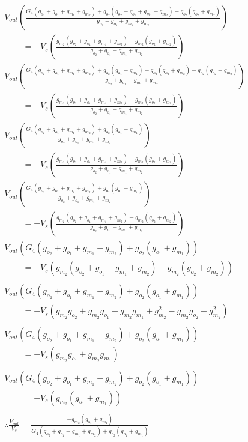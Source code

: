 \begin{enumerate}
\begin{align*}
      V_{out}\left(\frac{G_4(g_{o_2} + g_{o_1} + g_{m_1} + g_{m_2}) + g_{o_2}(g_{o_2} + g_{o_1} + g_{m_1} + g_{m_2}) - g_{o_2}(g_{o_2} + g_{m_2})}{g_{o_2} + g_{o_1} + g_{m_1} + g_{m_2}}\right) \\ \qquad \, = -V_{s}\left(\frac{g_{m_2}(g_{o_2} + g_{o_1} + g_{m_1} + g_{m_2}) - g_{m_2}(g_{o_2} + g_{m_2})}{g_{o_2} + g_{o_1} + g_{m_1} + g_{m_2}}\right) \\
      V_{out}\left(\frac{G_4(g_{o_2} + g_{o_1} + g_{m_1} + g_{m_2}) + g_{o_2}(g_{o_1} + g_{m_1}) + g_{o_2}(g_{o_2} + g_{m_2}) - g_{o_2}(g_{o_2} + g_{m_2})}{g_{o_2} + g_{o_1} + g_{m_1} + g_{m_2}}\right) \\ \qquad \, = -V_{s}\left(\frac{g_{m_2}(g_{o_2} + g_{o_1} + g_{m_1} + g_{m_2}) - g_{m_2}(g_{o_2} + g_{m_2})}{g_{o_2} + g_{o_1} + g_{m_1} + g_{m_2}}\right) \\
      V_{out}\left(\frac{G_4(g_{o_2} + g_{o_1} + g_{m_1} + g_{m_2}) + g_{o_2}(g_{o_1} + g_{m_1})}{g_{o_2} + g_{o_1} + g_{m_1} + g_{m_2}}\right) \\ \qquad \, = -V_{s}\left(\frac{g_{m_2}(g_{o_2} + g_{o_1} + g_{m_1} + g_{m_2}) - g_{m_2}(g_{o_2} + g_{m_2})}{g_{o_2} + g_{o_1} + g_{m_1} + g_{m_2}}\right) \\
      V_{out}\left(\frac{G_4(g_{o_2} + g_{o_1} + g_{m_1} + g_{m_2}) + g_{o_2}(g_{o_1} + g_{m_1})}{g_{o_2} + g_{o_1} + g_{m_1} + g_{m_2}}\right) \\ \qquad \, = -V_{s}\left(\frac{g_{m_2}(g_{o_2} + g_{o_1} + g_{m_1} + g_{m_2}) - g_{m_2}(g_{o_2} + g_{m_2})}{g_{o_2} + g_{o_1} + g_{m_1} + g_{m_2}}\right) \\
      V_{out}(G_4(g_{o_2} + g_{o_1} + g_{m_1} + g_{m_2}) + g_{o_2}(g_{o_1} + g_{m_1})) \\ \qquad \, = -V_{s}(g_{m_2}(g_{o_2} + g_{o_1} + g_{m_1} + g_{m_2}) - g_{m_2}(g_{o_2} + g_{m_2})) \\\\
      V_{out}(G_4(g_{o_2} + g_{o_1} + g_{m_1} + g_{m_2}) + g_{o_2}(g_{o_1} + g_{m_1})) \\ \qquad \, = -V_{s}(g_{m_2}g_{o_2} + g_{m_2}g_{o_1} + g_{m_2}g_{m_1} + g_{m_2}^2 - g_{m_2}g_{o_2} - g_{m_2}^2) \\\\
      V_{out}(G_4(g_{o_2} + g_{o_1} + g_{m_1} + g_{m_2}) + g_{o_2}(g_{o_1} + g_{m_1})) \\ \qquad \, = -V_{s}(g_{m_2}g_{o_1} + g_{m_2}g_{m_1}) \\\\
      V_{out}(G_4(g_{o_2} + g_{o_1} + g_{m_1} + g_{m_2}) + g_{o_2}(g_{o_1} + g_{m_1})) \\ \qquad \, = -V_{s}(g_{m_2}(g_{o_1} + g_{m_1})) \\\\
      \therefore \frac{V_{out}}{V_s} = \frac{-g_{m_2}(g_{o_1} + g_{m_1})}{G_4(g_{o_2} + g_{o_1} + g_{m_1} + g_{m_2}) + g_{o_2}(g_{o_1} + g_{m_1})} \tag{14} \\
    \end{align*}
\end{enumerate}

